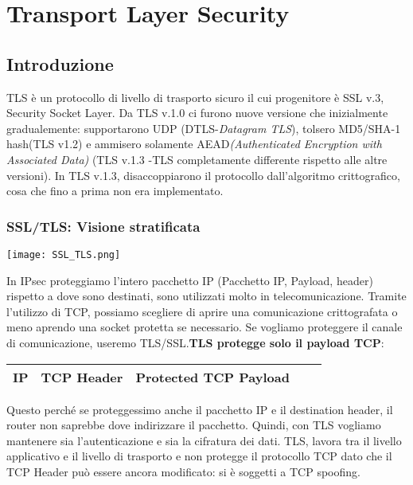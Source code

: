 \documentclass{article}
\theoremstyle{remark}
\begin{document}
\section{Transport Layer Security}
\subsection{Introduzione}
TLS è un protocollo di livello di trasporto sicuro il cui progenitore è SSL v.3, Security Socket Layer. Da TLS v.1.0 ci furono nuove versione che inizialmente gradualemente: supportarono UDP (DTLS-\emph{Datagram TLS}), tolsero MD5/SHA-1 hash(TLS v1.2) e ammisero solamente AEAD\emph{(Authenticated Encryption with Associated Data)} (TLS v.1.3 -TLS completamente differente rispetto alle altre versioni).
In TLS v.1.3, disaccoppiarono il protocollo dall'algoritmo crittografico, cosa che fino a prima non era implementato.
\subsubsection{SSL/TLS: Visione stratificata}
\begin{center}
    \texttt{[image: SSL\_TLS.png]}
\end{center}
In IPsec proteggiamo l'intero pacchetto IP (Pacchetto IP, Payload, header) rispetto a dove sono destinati, sono utilizzati molto in telecomunicazione. \newline
Tramite l'utilizzo di TCP, possiamo scegliere di aprire una comunicazione crittografata o meno aprendo una socket protetta se necessario. Se vogliamo proteggere il canale di comunicazione, useremo TLS/SSL.\textbf{TLS protegge solo il payload TCP}: 
\begin{center}
\begin{tabular}{ |c|c|c|c|c| } 
\hline
 IP & TCP Header & \textbf{Protected TCP Payload}\\
 \hline
\end{tabular}
\end{center}
Questo perché se proteggessimo anche il pacchetto IP e il destination header, il router non saprebbe dove indirizzare il pacchetto. Quindi, con TLS vogliamo mantenere sia l'autenticazione e sia la cifratura dei dati.\newline
TLS, lavora tra il livello applicativo e il livello di trasporto e non protegge il protocollo TCP dato che il TCP Header può essere ancora modificato: si è soggetti a TCP spoofing.
\end{document}
